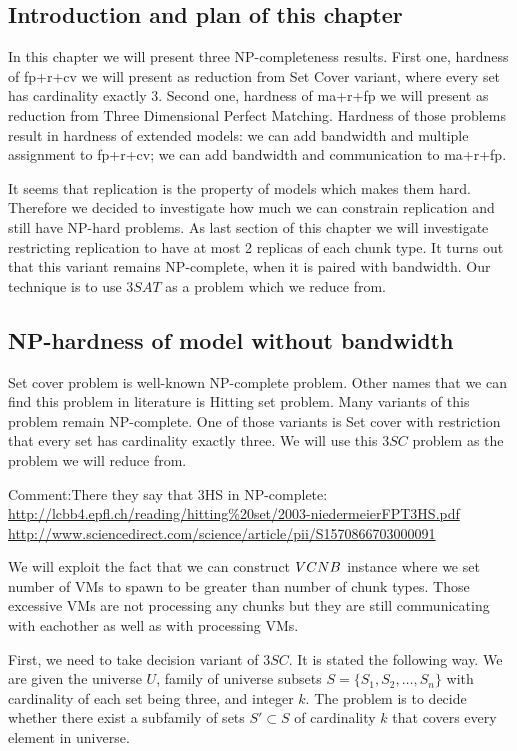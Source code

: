 \subsection{Introduction and plan of this chapter}

In this chapter we will present three NP-completeness results. First
one, hardness of fp+r+cv we will present as reduction from Set Cover
variant, where every set has cardinality exactly 3. Second one,
hardness of ma+r+fp we will present as reduction from Three
Dimensional Perfect Matching. Hardness of those problems result in
hardness of extended models: we can add bandwidth and multiple
assignment to fp+r+cv; we can add bandwidth and communication to
ma+r+fp.

It seems that replication is the property of models which makes them
hard. Therefore we decided to investigate how much we can constrain
replication and still have NP-hard problems. As last section of this
chapter we will investigate restricting replication to have at most 2
replicas of each chunk type. It turns out that this variant remains
NP-complete, when it is paired with bandwidth. Our technique is to use
$3SAT$ as a problem which we reduce from.

\subsection{NP-hardness of model without bandwidth}

Set cover problem is well-known NP-complete problem. Other names that
we can find this problem in literature is Hitting set problem. Many variants of
this problem remain NP-complete. One of those variants is Set cover
with restriction that every set has cardinality exactly three. We will
use this $3SC$ problem as the problem we will reduce from.

Comment:There they say that 3HS in NP-complete:
\url{http://lcbb4.epfl.ch/reading/hitting\%20set/2003-niedermeierFPT3HS.pdf}
\url{http://www.sciencedirect.com/science/article/pii/S1570866703000091}

We will exploit the fact that we can construct $VCNB$ instance where
we set number of VMs to spawn to be greater than number of chunk
types. Those excessive VMs are not processing any chunks but they are
still communicating with eachother as well as with processing
VMs.

First, we need to take decision variant of $3SC$. It is stated the
following way. We are given the universe $U$, family of universe
subsets $S = \{ S_1, S_2, \ldots, S_n \}$ with cardinality of each set
being three, and integer $k$. The problem is to decide whether there
exist a subfamily of sets $S' \subset S$ of cardinality $k$ that
covers every element in universe.

